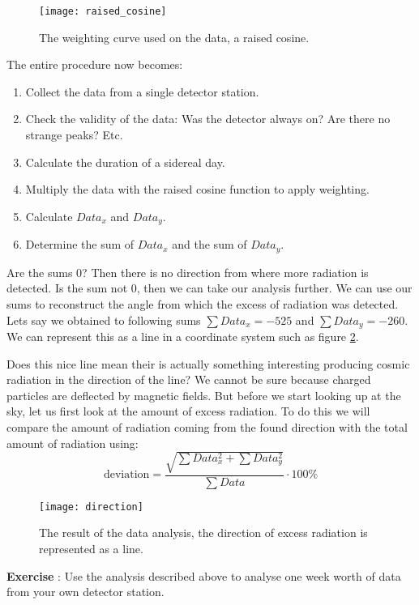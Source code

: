\begin{figure}\begin{center}
\texttt{[image: raised\_cosine]}
\caption{The weighting curve used on the data, a raised cosine.}\label{fig:raised_cosine}
\end{center}\end{figure} 

The entire procedure now becomes:
\begin{enumerate}[1.]
\item Collect the data from a single detector station.
\item Check the validity of the data: Was the detector always on? Are there no strange peaks? Etc.
\item Calculate the duration of a sidereal day.
\item Multiply the data with the raised cosine function to apply weighting.
\item Calculate $Data_x$ and $Data_y$.
\item Determine the sum of $Data_x$ and the sum of $Data_y$.
\end{enumerate}
Are the sums 0? Then there is no direction from where more radiation is detected. Is the sum not 0, then we can take our analysis further. We can use our sums to reconstruct the angle from which the excess of radiation was detected. Lets say we obtained to following sums $\sum Data_x = -525$  and $\sum Data_y = -260$. We can represent this as a line in a coordinate system such as figure \ref{fig:direction}. 

Does this nice line mean their is actually something interesting producing cosmic radiation in the direction of the line? We cannot be sure because charged particles are deflected by magnetic fields. But before we start looking up at the sky, let us first look at the amount of excess radiation. To do this we will compare the amount of radiation coming from the found direction with the total amount of radiation using:
\begin{equation} \mbox{deviation} = \frac{\sqrt{\sum Data_x^2 + \sum Data_y ^2}}{\sum Data} \cdot 100\% \end{equation}

\begin{figure}\begin{center}
\texttt{[image: direction]}
\caption{The result of the data analysis, the direction of excess radiation is represented as a line.}\label{fig:direction}
\end{center}\end{figure} 

\begin{shaded}
\textbf{Exercise \theExercise {}} : Use the analysis described above to analyse one week worth of data from your own detector station.\end{shaded}





